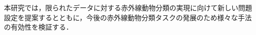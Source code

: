 \documentclass[a4paper,11pt,nomag]{jsreport}
\begin{document}
本研究では，限られたデータに対する赤外線動物分類の実現に向けて新しい問題設定を提案するとともに，今後の赤外線動物分類タスクの発展のため様々な手法の有効性を検証する．








\end{document}
